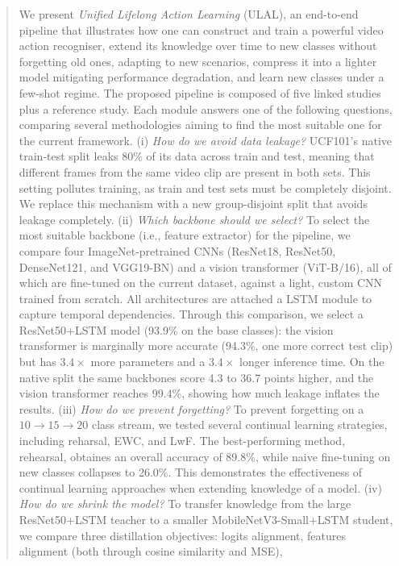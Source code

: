 \documentclass[conference]{IEEEtran}
\begin{document}
\begin{abstract}

We present \emph{Unified Lifelong Action Learning} (ULAL), an end-to-end pipeline that illustrates how one 
can construct and train a powerful video action recogniser, extend its knowledge over time to new classes 
without forgetting old ones, adapting to new scenarios, compress it into a lighter model mitigating performance
degradation, and learn new classes under a few-shot regime. The proposed pipeline is composed of five linked 
studies plus a reference study. Each module answers one of the following questions, comparing
several methodologies aiming to find the most suitable one for the current framework. 
(i) \emph{How do we avoid data leakage?} UCF101's native train-test split leaks 80\% of its data across train and test,
meaning that different frames from the same video clip are present in both sets. This setting pollutes training, 
as train and test sets must be completely disjoint. We replace this mechanism with a new
group-disjoint split that avoids leakage completely. 
(ii) \emph{Which backbone should we select?} To select the most suitable backbone (i.e., feature extractor) for the pipeline, 
we compare four ImageNet-pretrained CNNs (ResNet18, ResNet50, DenseNet121, and VGG19-BN) and a vision
transformer (ViT-B/16), all of which are fine-tuned on the current dataset, against a light, custom CNN
trained from scratch. All architectures are attached a LSTM module to capture temporal dependencies. Through this comparison,
we select a ResNet50+LSTM model (93.9\% on the base classes): the vision transformer is marginally more accurate
(94.3\%, one more correct test clip) but has $3.4\times$ more parameters and a $3.4\times$ longer inference time.
On the native split the same backbones score 4.3 to 36.7 points higher, and the vision transformer reaches 99.4\%,
showing how much leakage inflates the results.
(iii) \emph{How do we prevent forgetting?} To prevent forgetting on a $10\!\to\!15\!\to\!20$ class stream, we tested several 
continual learning strategies, including reharsal, EWC, and LwF. The best-performing method, rehearsal, obtaines an overall accuracy of 89.8\%,
while naive fine-tuning on new classes collapses to 26.0\%. This demonstrates the effectiveness of continual learning approaches when extending knowledge of a
model. 
(iv) \emph{How do we shrink the model?} To transfer knowledge from the large ResNet50+LSTM teacher to a smaller MobileNetV3-Small+LSTM student, 
we compare three distillation objectives: logits alignment, features alignment (both through cosine similarity and MSE), 

\end{abstract}
\end{document}
